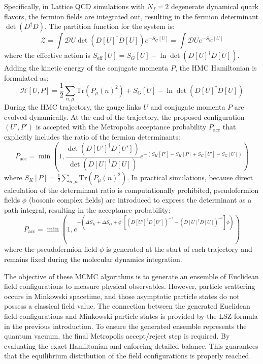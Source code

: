 Specifically, in Lattice QCD simulations with $N_f=2$ degenerate dynamical quark flavors, the fermion fields are integrated out, resulting in the fermion determinant $\det(D^\dagger D)$. The partition function for the system is:
\begin{equation}
\mathcal{Z} = \int \mathcal{D}U \det\left(D[U]^\dagger D[U]\right) e^{-S_G[U]} = \int \mathcal{D}U e^{-S_{\mathrm{eff}}[U]}
\end{equation}
where the effective action is $S_{\mathrm{eff}}[U] = S_G[U] - \ln \det(D[U]^\dagger D[U])$. Adding the kinetic energy of the conjugate momenta $P$, the HMC Hamiltonian is formulated as:
\begin{equation}
\mathcal{H}[U, P] = \frac{1}{2} \sum_{n, \mu} \text{Tr} \left( P_\mu(n)^2 \right) + S_G[U] - \ln \det \left( D[U]^\dagger D[U] \right)
\end{equation}
During the HMC trajectory, the gauge links $U$ and conjugate momenta $P$ are evolved dynamically. At the end of the trajectory, the proposed configuration $(U', P')$ is accepted with the Metropolis acceptance probability $P_{\mathrm{acc}}$ that explicitly includes the ratio of the fermion determinants:
\begin{equation}
P_{\mathrm{acc}} = \min\left(1, \frac{\det\left(D[U']^\dagger D[U']\right)}{\det\left(D[U]^\dagger D[U]\right)} e^{-\left(S_K[P'] - S_K[P] + S_G[U'] - S_G[U]\right)}\right)
\end{equation}
where $S_K[P] = \frac{1}{2} \sum_{n, \mu} \text{Tr} \left( P_\mu(n)^2 \right)$. In practical simulations, because direct calculation of the determinant ratio is computationally prohibited, pseudofermion fields $\phi$ (bosonic complex fields) are introduced to express the determinant as a path integral, resulting in the acceptance probability:
\begin{equation}
P_{\mathrm{acc}} = \min\left(1, e^{-\left( \Delta S_K + \Delta S_G + \phi^\dagger \left[ (D[U']^\dagger D[U'])^{-1} - (D[U]^\dagger D[U])^{-1} \right] \phi \right)}\right)
\end{equation}
where the pseudofermion field $\phi$ is generated at the start of each trajectory and remains fixed during the molecular dynamics integration.

The objective of these MCMC algorithms is to generate an ensemble of Euclidean field configurations to measure physical observables. However, particle scattering occurs in Minkowski spacetime, and those asymptotic particle states do not possess a classical field value. The connection between the generated Euclidean field configurations and Minkowski particle states is provided by the LSZ formula in the previous introduction.
To ensure the generated ensemble represents the quantum vacuum, the final Metropolis accept/reject step is required. By evaluating the exact Hamiltonian and enforcing detailed balance. This guarantees that the equilibrium distribution of the field configurations is properly reached.


